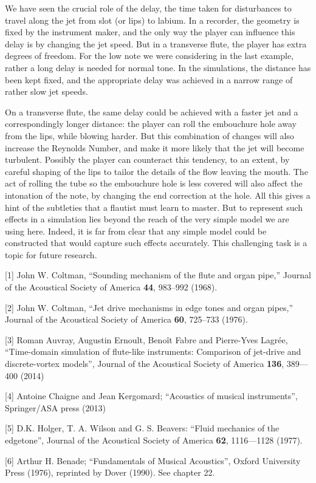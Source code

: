   We have seen the crucial role of the delay, the time taken for disturbances 
  to travel along the jet from slot (or lips) to labium. In a recorder, the 
  geometry is fixed by the instrument maker, and the only way the player can 
  influence this delay is by changing the jet speed. But in a transverse flute, 
  the player has extra degrees of freedom. For the low note we were considering 
  in the last example, rather a long delay is needed for normal tone. In the 
  simulations, the distance has been kept fixed, and the appropriate delay was 
  achieved in a narrow range of rather slow jet speeds. 

  On a transverse flute, the same delay could be achieved with a faster jet and 
  a correspondingly longer distance: the player can roll the embouchure hole 
  away from the lips, while blowing harder. But this combination of changes 
  will also increase the Reynolds Number, and make it more likely that the jet 
  will become turbulent. Possibly the player can counteract this tendency, to 
  an extent, by careful shaping of the lips to tailor the details of the flow 
  leaving the mouth. The act of rolling the tube so the embouchure hole is less 
  covered will also affect the intonation of the note, by changing the end 
  correction at the hole. All this gives a hint of the subtleties that a 
  flautist must learn to master. But to represent such effects in a simulation 
  lies beyond the reach of the very simple model we are using here. Indeed, it 
  is far from clear that any simple model could be constructed that would 
  capture such effects accurately. This challenging task is a topic for future 
  research. 



  \sectionreferences{}[1] John W. Coltman, “Sounding mechanism of the flute and 
  organ pipe,” Journal of the Acoustical Society of America \textbf{44}, 
  983–992 (1968). 

  [2] John W. Coltman, “Jet drive mechanisms in edge tones and organ pipes,” 
  Journal of the Acoustical Society of America \textbf{60}, 725–733 (1976). 

  [3] Roman Auvray, Augustin Ernoult, Benoît Fabre and Pierre-Yves Lagrée, 
  “Time-domain simulation of flute-like instruments: Comparison of jet-drive 
  and discrete-vortex models”, Journal of the Acoustical Society of America 
  \textbf{136}, 389—400 (2014) 

  [4] Antoine Chaigne and Jean Kergomard; “Acoustics of musical instruments”, 
  Springer/ASA press (2013) 

  [5] D.K. Holger, T. A. Wilson and G. S. Beavers: “Fluid mechanics of the 
  edgetone'', Journal of the Acoustical Society of America \textbf{62}, 
  1116—1128 (1977). 

  [6] Arthur H. Benade; “Fundamentals of Musical Acoustics”, Oxford University 
  Press (1976), reprinted by Dover (1990). See chapter 22. 